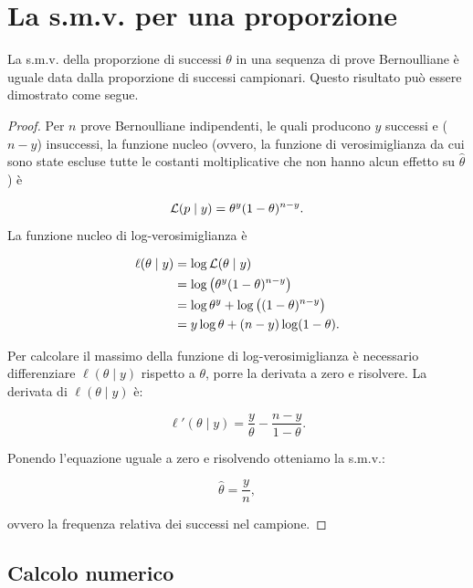 \documentclass[
  11pt,
]{krantz}
\theoremstyle{definition}
\theoremstyle{definition}
\theoremstyle{definition}
\theoremstyle{definition}
\theoremstyle{remark}
\begin{document}
\hypertarget{derivation-smv-prop}{%
\section{La s.m.v. per una proporzione}\label{derivation-smv-prop}}

La s.m.v. della proporzione di successi \(\theta\) in una sequenza di prove Bernoulliane è uguale data dalla proporzione di successi campionari. Questo risultato può essere dimostrato come segue.

\begin{proof}
Per \(n\) prove Bernoulliane indipendenti, le quali producono \(y\) successi e (\(n-y\)) insuccessi, la funzione nucleo (ovvero, la funzione di verosimiglianza da cui sono state escluse tutte le costanti moltiplicative che non hanno alcun effetto su \(\hat{\theta}\)) è

\[
\mathcal{L}(p \mid y) = \theta^y (1-\theta)^{n - y}.\notag
\] La funzione nucleo di log-verosimiglianza è

\[
\begin{aligned}
\ell(\theta \mid y) &= \log \mathcal{L}(\theta \mid y) \notag\\
          &= \log \left(\theta^y (1-\theta)^{n - y} \right) \notag\\
          &= \log \theta^y + \log \left( (1-\theta)^{n - y} \right) \notag\\
          &= y \log \theta + (n - y) \log (1-\theta).\notag
\end{aligned}
\]

Per calcolare il massimo della funzione di log-verosimiglianza è necessario differenziare \(\ell(\theta \mid y)\) rispetto a \(\theta\), porre la derivata a zero e risolvere. La derivata di \(\ell(\theta \mid y)\) è:

\[
\ell'(\theta \mid y) = \frac{y}{\theta} -\frac{n-y}{1-\theta}.
\]

Ponendo l'equazione uguale a zero e risolvendo otteniamo la s.m.v.:

\begin{equation}
  \hat{\theta} = \frac{y}{n},
  \label{eq:mlprop}
\end{equation}

ovvero la frequenza relativa dei successi nel campione.
\end{proof}

\hypertarget{calcolo-numerico}{%
\subsection*{Calcolo numerico}\label{calcolo-numerico}}
\end{document}
